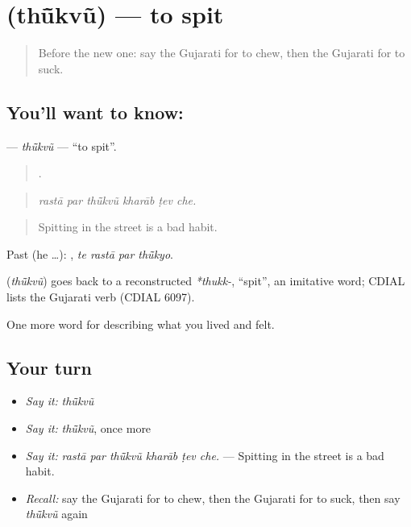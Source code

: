 \section[\texorpdfstring{\gu{થૂંકવું} (thū̃kvũ)}{થૂંકવું (thū̃kvũ)}]{ (thū̃kvũ) — to spit}

\label{lesson:GU-C474-thukvu}



\begin{quote}
Before the new one: say the Gujarati for to chew, then the Gujarati for to suck.
\end{quote}

\subsection*{You'll want to know: }
\textbf{} — \emph{thū̃kvũ} — \textquotedblleft{}to spit\textquotedblright{}.

\begin{quote}
     .
\end{quote}

\begin{quote}
\emph{rastā par thū̃kvũ kharāb ṭev che.}
\end{quote}

\begin{quote}
Spitting in the street is a bad habit.
\end{quote}

Past (he …):    , \emph{te rastā par thū̃kyo}.

\begin{cousinweb}
\textbf{} (\emph{thū̃kvũ}) goes back to a reconstructed \emph{*thukk-}, \textquotedblleft{}spit\textquotedblright{}, an imitative word; CDIAL lists the Gujarati verb (CDIAL 6097).
\end{cousinweb}

\begin{grammarlens}[title={What you've built}]
One more word for describing what you lived and felt.
\end{grammarlens}

\subsection*{Your turn}
\begin{itemize}
\raggedright
  \item \emph{Say it:} \emph{thū̃kvũ}
  \item \emph{Say it:} \emph{thū̃kvũ}, once more
  \item \emph{Say it:} \emph{rastā par thū̃kvũ kharāb ṭev che.} — Spitting in the street is a bad habit.
  \item \emph{Recall:} say the Gujarati for to chew, then the Gujarati for to suck, then say \emph{thū̃kvũ} again
\end{itemize}

